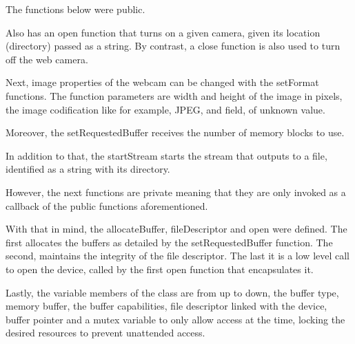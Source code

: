 The functions below were public.

Also has an open function that turns on a given camera, given its location (directory) passed as a string. By contrast, a close function is also used to turn off the web camera.

Next, image properties of the webcam can be changed with the setFormat functions. The function parameters are width and height of the image in pixels, the image codification like for example, JPEG, and field, of unknown value.

Moreover, the setRequestedBuffer receives the number of memory  blocks to use.

In addition to that, the startStream starts the stream that outputs to a file, identified as a string with its directory.

However, the next functions are private meaning that they are only invoked as a callback of the public functions aforementioned.

With that in mind, the allocateBuffer, fileDescriptor and open were defined. The first allocates the buffers as detailed by the setRequestedBuffer function. The second, maintains the integrity of the file descriptor. The last it is a low level call to open the device, called by the first open function that encapsulates it.

Lastly, the variable members of the class are from up to down, the buffer type, memory buffer, the buffer capabilities, file descriptor linked with the device, buffer pointer and a mutex variable to only allow access at the time, locking the desired resources to prevent unattended access.

